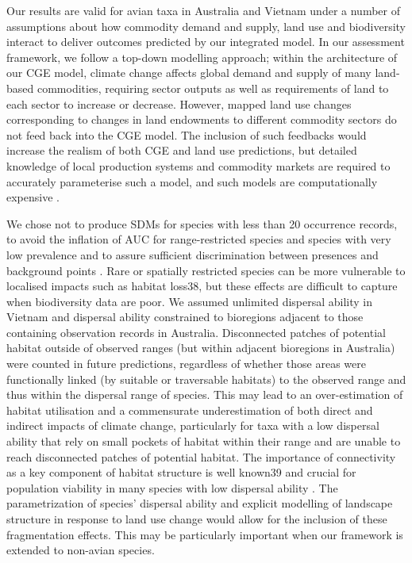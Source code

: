 \documentclass[titlesmallcaps,copyrightpage]{uomthesis}\usepackage[]{graphicx}\usepackage[]{color}
\begin{document}
Our results are valid for avian taxa in Australia and Vietnam under a number of assumptions about how commodity demand and supply, land use and biodiversity interact to deliver outcomes predicted by our integrated model. In our assessment framework, we follow a top-down modelling approach; within the architecture of our CGE model, climate change affects global demand and supply of many land-based commodities, requiring sector outputs as well as requirements of land to each sector to increase or decrease. However, mapped land use changes corresponding to changes in land endowments to different commodity sectors do not feed back into the CGE model. The inclusion of such feedbacks would increase the realism of both CGE and land use predictions, but detailed knowledge of local production systems and commodity markets are required to accurately parameterise such a model, and such models are computationally expensive \citep{bryan_land-use_2016}.

We chose not to produce SDMs for species with less than 20 occurrence records, to avoid the inflation of AUC for range-restricted species and species with very low prevalence \citep{van_proosdij_minimum_2016} and to assure sufficient discrimination between presences and background points \citep{hernandez_effect_2006, wisz_effects_2008}. Rare or spatially restricted species can be more vulnerable to localised impacts such as habitat loss38, but these effects are difficult to capture when biodiversity data are poor. We assumed unlimited dispersal ability in Vietnam and dispersal ability constrained to bioregions adjacent to those containing observation records in Australia. Disconnected patches of potential habitat outside of observed ranges (but within adjacent bioregions in Australia) were counted in future predictions, regardless of whether those areas were functionally linked (by suitable or traversable habitats) to the observed range and thus within the dispersal range of species. This may lead to an over-estimation of habitat utilisation and a commensurate underestimation of both direct and indirect impacts of climate change, particularly for taxa with a low dispersal ability that rely on small pockets of habitat within their range and are unable to reach disconnected patches of potential habitat. The importance of connectivity as a key component of habitat structure is well known39 and crucial for population viability in many species with low dispersal ability \citep{gordon_use_2012, cadenhead_climate_2016}. The parametrization of species’ dispersal ability and explicit modelling of landscape structure in response to land use change would allow for the inclusion of these fragmentation effects. This may be particularly important when our framework is extended to non-avian species.
\end{document}
